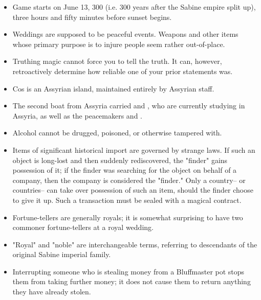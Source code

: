 \documentclass[blue]{Kos}
\begin{document}
\name{\bErrata{}}

\begin{itemize}
\item Game starts on June 13, 300 (i.e. 300 years after the Sabine empire split up), three hours and fifty minutes before sunset begins.
\item Weddings are supposed to be peaceful events. Weapons and other items whose primary purpose is to injure people seem rather out-of-place.
\item Truthing magic cannot force you to tell the truth. It can, however, retroactively determine how reliable one of your prior statements was.
\item Cos is an Assyrian island, maintained entirely by Assyrian staff.
\item The second boat from Assyria carried \cPoet{} and \cWard{}, who are currently studying in Assyria, as well as the peacemakers \cAnarchist{} and \cArchaeologist{}.
\item Alcohol cannot be drugged, poisoned, or otherwise tampered with.
\item Items of significant historical import are governed by strange laws. If such an object is long-lost and then suddenly rediscovered, the "finder" gains possession of it; if the finder was searching for the object on behalf of a company, then the company is considered the "finder." Only a country-- or countries-- can take over possession of such an item, should the finder choose to give it up. Such a transaction must be sealed with a magical contract.
\item Fortune-tellers are generally royals; it is somewhat surprising to have two commoner fortune-tellers at a royal wedding.
\item "Royal" and "noble" are interchangeable terms, referring to descendants of the original Sabine imperial family.
\item Interrupting someone who is stealing money from a Bluffmaster pot stops them from taking further money; it does not cause them to return anything they have already stolen.
\end{itemize}
\end{document}
